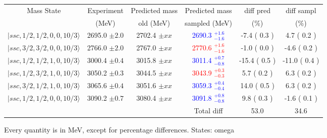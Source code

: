 \begin{tabular}{c | c  c  c  c  c}\hline \hline
Mass State & Experiment  &   Predicted mass  &    Predicted mass & diff pred & diff sampl\\ 
           & (MeV)       &   old (MeV)       &    sampled (MeV)  &     (\%) &     (\%)  \\ \hline
$\vert ssc,1/2,1/2,0,0,10/3 \rangle$ & 2695.0 $\pm 2.0 $  & 2702.4 $\pm xx$  & \textcolor{blue}{ 2690.3  $^{+ 1.6 }_{ -1.6 }$}  &   -7.4 ( 0.3 )  &   4.7 ( 0.2 ) \\  
$\vert ssc,3/2,3/2,0,0,10/3 \rangle$ & 2766.0 $\pm 2.0 $  & 2767.0 $\pm xx$  & \textcolor{red}{ 2770.6  $^{+ 1.6 }_{ -1.6 }$}  &   -1.0 ( 0.0 )  &   -4.6 ( 0.2 ) \\  
$\vert ssc,1/2,1/2,1,0,10/3 \rangle$ & 3000.4 $\pm 0.4 $  & 3015.8 $\pm xx$  & \textcolor{blue}{ 3011.4  $^{+ 0.7 }_{ -0.8 }$}  &   -15.4 ( 0.5 )  &   -11.0 ( 0.4 ) \\  
$\vert ssc,1/2,3/2,1,0,10/3 \rangle$ & 3050.2 $\pm 0.3 $  & 3044.5 $\pm xx$  & \textcolor{red}{ 3043.9  $^{+ 0.3 }_{ -0.3 }$}  &   5.7 ( 0.2 )  &   6.3 ( 0.2 ) \\  
$\vert ssc,3/2,1/2,1,0,10/3 \rangle$ & 3065.6 $\pm 0.4 $  & 3051.6 $\pm xx$  & \textcolor{blue}{ 3059.3  $^{+ 0.4 }_{ -0.4 }$}  &   14.0 ( 0.5 )  &   6.3 ( 0.2 ) \\  
$\vert ssc,1/2,1/2,0,0,10/3 \rangle$ & 3090.2 $\pm 0.7 $  & 3080.4 $\pm xx$  & \textcolor{blue}{ 3091.8  $^{+ 0.8 }_{ -0.8 }$}  &   9.8 ( 0.3 )  &   -1.6 ( 0.1 ) \\  
\hline
  &  &  & Total diff &  53.0  & 34.6 \\ 
\hline \hline
\end{tabular}
\caption{Every quantity is in MeV, except for percentage differences. States: omega }

